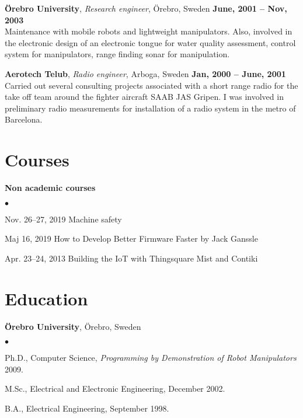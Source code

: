 \documentclass[a4paper,margin,line]{res} \usepackage{latexsym}
\newenvironment{list2}{
  \begin{list}{$\bullet$}{%
      \setlength{\itemsep}{0in} \setlength{\parsep}{0in}
      \setlength{\parskip}{0in} \setlength{\topsep}{0in}
      \setlength{\partopsep}{0in}
      \setlength{\leftmargin}{0.2in}}}{\end{list}}
\begin{document}
\begin{resume}
{\bf \"Orebro University}, {\em Research engineer}, \"Orebro, Sweden
\hfill {\bf June, 2001 -- Nov, 2003}\\ Maintenance with mobile robots
and lightweight manipulators. Also, involved in the electronic design
of an electronic tongue for water quality assessment, control system
for manipulators, range finding sonar for manipulation.

{\bf Aerotech Telub}, {\em Radio engineer}, Arboga, Sweden \hfill {\bf
  Jan, 2000 -- June, 2001}\\ Carried out several consulting projects
associated with a short range radio for the take off team around the
fighter aircraft SAAB JAS Gripen.  I was involved in preliminary radio
measurements for installation of a radio system in the metro of
Barcelona.

\section{\sc Courses}
{\bf Non academic courses}\\
\begin{list2}
\item Nov. 26--27, 2019 Machine safety
\item Maj 16, 2019 How to Develop Better Firmware Faster by Jack Ganssle
  \item Apr. 23--24, 2013 Building the IoT with Thingsquare Mist and Contiki
\end{list2}


\section{\sc Education}
{\bf \"Orebro University}, \"Orebro, Sweden\\

\vspace*{-.1in}
\begin{list2}
\item Ph.D., Computer Science, {\it Programming by Demonstration of
  Robot Manipulators} 2009.
\vspace*{.03in}
\item M.Sc., Electrical and Electronic Engineering, December 2002.
\vspace*{.03in}
\item B.A., Electrical Engineering, September 1998.
\end{list2}


\end{resume}
\end{document}
